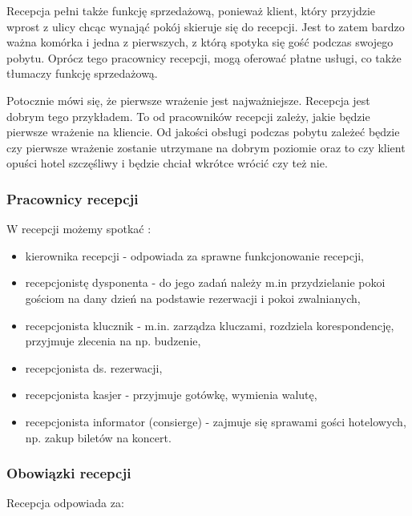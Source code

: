 \documentclass[a4paper,onecolumn,oneside,11pt,wide,floatssmall]{mwrep}
\theoremstyle{definition}
\theoremstyle{plain}%
\theoremstyle{remark}
\begin{document}
Recepcja pełni także funkcję sprzedażową, ponieważ klient, 
który przyjdzie wprost z ulicy chcąc wynająć pokój skieruje się do recepcji. 
Jest to zatem  bardzo ważna komórka i jedna z pierwszych, z którą spotyka 
się gość podczas swojego pobytu. Oprócz tego pracownicy recepcji, mogą 
oferować płatne usługi, co także tłumaczy funkcję sprzedażową.

Potocznie mówi się, że pierwsze wrażenie jest najważniejsze. Recepcja jest 
dobrym tego przykładem. To od pracowników recepcji zależy, jakie będzie 
pierwsze wrażenie na kliencie. Od jakości obsługi podczas pobytu zależeć 
będzie czy pierwsze wrażenie zostanie utrzymane na dobrym poziomie oraz to 
czy klient opuści hotel szczęśliwy i będzie chciał wkrótce wrócić czy też
 nie.


\subsubsection{Pracownicy recepcji}
W recepcji możemy spotkać \cite[str. 47-51]{OrgaDzialHot}:

\begin{itemize}
  \item kierownika recepcji - odpowiada za sprawne 
  funkcjonowanie recepcji,
  \item recepcjonistę dysponenta - do jego zadań należy m.in przydzielanie 
  pokoi gościom na dany dzień na podstawie rezerwacji i pokoi zwalnianych,
  \item recepcjonista klucznik - m.in. zarządza kluczami, rozdziela 
  korespondencję, przyjmuje zlecenia na np. budzenie,
  \item recepcjonista ds. rezerwacji,
  \item recepcjonista kasjer - przyjmuje gotówkę, wymienia walutę,
  \item recepcjonista informator (consierge) - zajmuje się sprawami gości 
  hotelowych, np. zakup biletów na koncert.
\end{itemize}

\subsubsection{Obowiązki recepcji} 
Recepcja odpowiada za\cite[str. 50]{OrgaDzialHot}:
\end{document}
